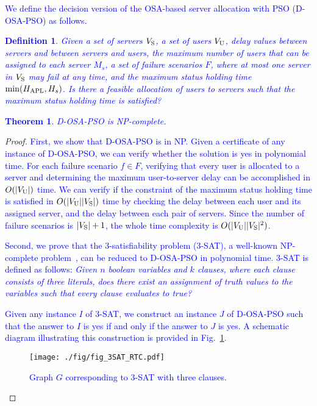 \documentclass[10pt, letterpaper]{IEEEtran}
\newtheorem{thm}{Theorem} %
\newtheorem{definition}{Definition}
\newcommand\blue[1]{\textcolor{blue}{#1}}
\begin{document}
\begin{CJK}{UTF8}{ipxm}
\blue{
We define the decision version of the OSA-based server allocation with PSO (D-OSA-PSO) as follows.
\begin{definition}
    Given a set of servers $V_{\rm{S}}$, a set of users $V_{\rm{U}}$, delay values between servers and between servers and users, the maximum number of users that can be assigned to each server $M_s$, a set of failure scenarios $F$, where at most one server in $V_{\rm{S}}$ may fail at any time, 
    and the maximum status holding time $\min(H_{\rm APL},H_s)$.
    Is there a feasible allocation of users to servers such that the maximum status holding time is satisfied?
\end{definition}
\begin{thm}
D-OSA-PSO is NP-complete.
\end{thm}
}
\begin{proof}
  \blue{
  First, we show that D-OSA-PSO is in NP.
  Given a certificate of any instance of D-OSA-PSO, we can verify whether the solution is yes in polynomial time.  %
  For each failure scenario $f \in F$, verifying that every user is allocated to a server and determining the maximum user-to-server delay can be accomplished in $O(|V_{\rm{U}}|)$ time.
  We can verify if the constraint of the maximum status holding time is satisfied in $O(|V_{\rm{U}}||V_{\rm{S}}|)$ time by checking the delay between each user and its assigned server, and the delay between each pair of servers.
  Since the number of failure scenarios is $|V_{\rm{S}}|+1$, the whole time complexity is $O(|V_{\rm{U}}||V_{\rm{S}}|^2)$.
  }

  \blue{
  Second, we prove that the 3-satisfiability problem (3-SAT), a well-known NP-complete problem~\cite{3_12_3SAT}, can be reduced to D-OSA-PSO in polynomial time. 
  3-SAT is defined as follows:
  {\it Given $n$ boolean variables and $k$ clauses, where each clause consists of three literals, does there exist an assignment of truth values to the variables such that every clause evaluates to true?}
  }

  \blue{
  Given any instance $I$ of 3-SAT, we construct an instance $J$ of D-OSA-PSO such that the answer to $I$ is yes if and only if the answer to $J$ is yes. %
  A schematic diagram illustrating this construction is provided in Fig.~\ref{fig:3SAT_RTC}.
  }
  \begin{figure}[!t]
    \begin{center}
      \texttt{[image: ./fig/fig\_3SAT\_RTC.pdf]}
    \end{center}
    \caption{\blue{Graph $G$ corresponding to 3-SAT with three clauses.}}
    \label{fig:3SAT_RTC}
  \end{figure}


\end{proof}
\end{CJK}
\end{document}
